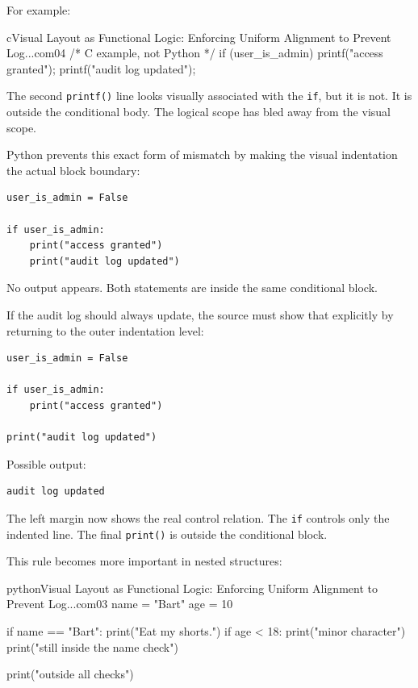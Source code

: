 For example:

\begin{codebox}[]{c}{Visual Layout as Functional Logic: Enforcing Uniform Alignment to Prevent Log...}{com04}
/* C example, not Python */
if (user_is_admin)
    printf("access granted\n");
    printf("audit log updated\n");
\end{codebox}


The second \texttt{printf()} line looks visually associated with the \texttt{if}, but it is not. It is outside the conditional body. The logical scope has bled away from the visual scope.

Python prevents this exact form of mismatch by making the visual indentation the actual block boundary:

\begin{verbatim}
user_is_admin = False

if user_is_admin:
    print("access granted")
    print("audit log updated")
\end{verbatim}

No output appears. Both statements are inside the same conditional block.

If the audit log should always update, the source must show that explicitly by returning to the outer indentation level:

\begin{verbatim}
user_is_admin = False

if user_is_admin:
    print("access granted")

print("audit log updated")
\end{verbatim}

Possible output:

\begin{verbatim}
audit log updated
\end{verbatim}

The left margin now shows the real control relation. The \texttt{if} controls only the indented line. The final \texttt{print()} is outside the conditional block.

This rule becomes more important in nested structures:

\begin{codebox}[]{python}{Visual Layout as Functional Logic: Enforcing Uniform Alignment to Prevent Log...}{com03}
name = "Bart"
age = 10

if name == "Bart":
    print("Eat my shorts.")
    if age < 18:
        print("minor character")
    print("still inside the name check")

print("outside all checks")
\end{codebox}


